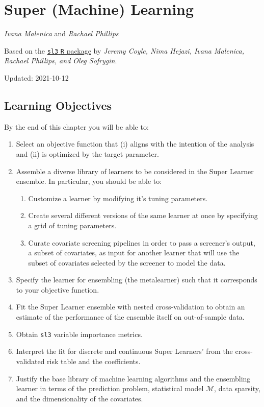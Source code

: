 \documentclass[
  12pt, krantz2,
]{book}
\newcommand{\passthrough}[1]{#1}
\providecommand{\tightlist}{%
  \setlength{\itemsep}{0pt}\setlength{\parskip}{0pt}}
\theoremstyle{definition}
\theoremstyle{definition}
\theoremstyle{definition}
\newcommand{\M}{\mathcal{M}}
\newcommand{\1}{\mathbbm{1}}
\begin{document}
\hypertarget{sl3}{%
\chapter{Super (Machine) Learning}\label{sl3}}

\emph{Ivana Malenica} and \emph{Rachael Phillips}

Based on the \href{https://github.com/tlverse/sl3}{\passthrough{\lstinline!sl3!} \passthrough{\lstinline!R!} package} by \emph{Jeremy
Coyle, Nima Hejazi, Ivana Malenica, Rachael Phillips, and Oleg Sofrygin}.

Updated: 2021-10-12

\hypertarget{learning-objectives-2}{%
\section*{Learning Objectives}\label{learning-objectives-2}}


By the end of this chapter you will be able to:

\begin{enumerate}
\def\labelenumi{\arabic{enumi}.}
\item
  Select an objective function that (i) aligns with the intention of the
  analysis and (ii) is optimized by the target parameter.
\item
  Assemble a diverse library of learners to be considered in the Super Learner
  ensemble. In particular, you should be able to:

  \begin{enumerate}
  \def\labelenumii{\alph{enumii}.}
  \tightlist
  \item
    Customize a learner by modifying it's tuning parameters.
  \item
    Create several different versions of the same learner at once by
    specifying a grid of tuning parameters.
  \item
    Curate covariate screening pipelines in order to pass a screener's
    output, a subset of covariates, as input for another learner that will
    use the subset of covariates selected by the screener to model the data.
  \end{enumerate}
\item
  Specify the learner for ensembling (the metalearner) such that it corresponds
  to your objective function.
\item
  Fit the Super Learner ensemble with nested cross-validation to obtain an
  estimate of the performance of the ensemble itself on out-of-sample data.
\item
  Obtain \passthrough{\lstinline!sl3!} variable importance metrics.
\item
  Interpret the fit for discrete and continuous Super Learners' from the
  cross-validated risk table and the coefficients.
\item
  Justify the base library of machine learning algorithms and the ensembling
  learner in terms of the prediction problem, statistical model \(\M\), data
  sparsity, and the dimensionality of the covariates.
\end{enumerate}
\end{document}
